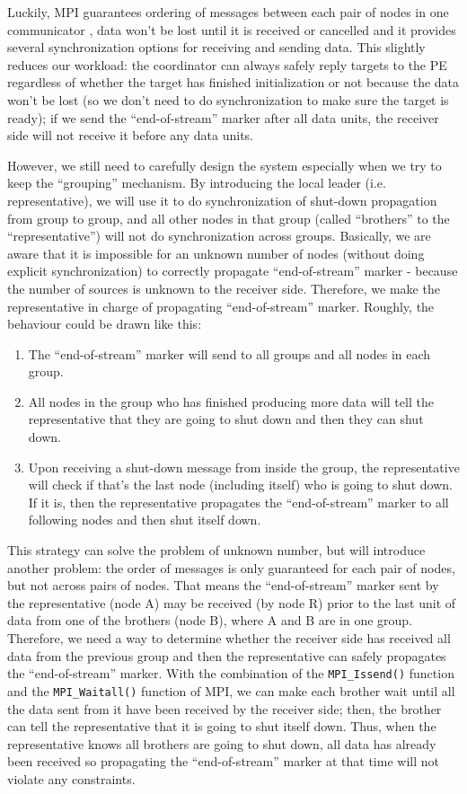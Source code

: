 \documentclass[msc,cs,logo]{infthesis}
\begin{document}
	Luckily, MPI guarantees ordering of messages between each pair of nodes in one communicator \cite{MPI-3.0}, data won't be lost until it is received or cancelled and it provides several synchronization options for receiving and sending data. This slightly reduces our workload: the coordinator can always safely reply targets to the PE regardless of whether the target has finished initialization or not because the data won't be lost (so we don't need to do synchronization to make sure the target is ready); if we send the ``end-of-stream'' marker after all data units, the receiver side will not receive it before any data units.
	
	However, we still need to carefully design the system especially when we try to keep the ``grouping'' mechanism. By introducing the local leader (i.e. representative), we will use it to do synchronization of shut-down propagation from group to group, and all other nodes in that group (called ``brothers'' to the ``representative'') will not do synchronization across groups. Basically, we are aware that it is impossible for an unknown number of nodes (without doing explicit synchronization) to correctly propagate ``end-of-stream'' marker - because the number of sources is unknown to the receiver side. Therefore, we make the representative in charge of propagating ``end-of-stream'' marker. Roughly, the behaviour could be drawn like this:
	\begin{enumerate}
		\item The ``end-of-stream'' marker will send to all groups and all nodes in each group.
		\item All nodes in the group who has finished producing more data will tell the representative that they are going to shut down and then they can shut down.
		\item Upon receiving a shut-down message from inside the group, the representative will check if that's the last node (including itself) who is going to shut down. If it is, then the representative propagates the ``end-of-stream'' marker to all following nodes and then shut itself down.
	\end{enumerate}
	
	This strategy can solve the problem of unknown number, but will introduce another problem: the order of messages is only guaranteed for each pair of nodes, but not across pairs of nodes. That means the ``end-of-stream'' marker sent by the representative (node A) may be received (by node R) prior to the last unit of data from one of the brothers (node B), where A and B are in one group.
	 Therefore, we need a way to determine whether the receiver side has received all data from the previous group and then the representative can safely propagates the ``end-of-stream'' marker. With the combination of the 
\lstinline|MPI_Issend()| function and the \lstinline|MPI_Waitall()| function of MPI, we can make each brother wait until all the data sent from it have been received by the receiver side; then, the brother can tell the representative that it is going to shut itself down. Thus, when the representative knows all brothers are going to shut down, all data has already been received so propagating the ``end-of-stream'' marker at that time will not violate any constraints.
	
\end{document}
